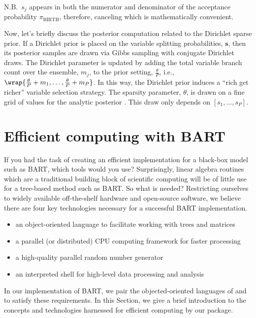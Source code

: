 \documentclass[article]{jss}
\begin{document}
N.B.\ $s_j$ appears in both the numerator and denominator
of the acceptance probability $\pi_{\mathrm{BIRTH}}$,
therefore, canceling which is mathematically convenient.

Now, let's briefly discuss the posterior computation related to the
Dirichlet sparse prior.  If a Dirichlet prior is placed on the
variable splitting probabilities, $\bm{s}$, then its posterior samples
are drawn via Gibbs sampling with conjugate Dirichlet draws.  The
Dirichlet parameter is updated by adding the total variable
branch count over the ensemble, $m_j$, to the prior setting,
$\frac{\theta}{P}$, i.e.,
$\wrap{\frac{\theta}{P}+m_1, \dots, \frac{\theta}{P}+m_P}$.
In this way, the Dirichlet prior
induces a ``rich get richer'' variable selection strategy.
The sparsity parameter, $\theta$, is drawn on a fine grid of values
for the analytic posterior \citep{Line16}. This draw only depends on
$[s_1,\dots,s_P]$.

\section{Efficient computing with BART}\label{efficient}

If you had the task of creating an efficient implementation for a
black-box model such as BART, which tools would you use?
Surprisingly, linear algebra routines which are a traditional building
block of scientific computing will be of little use for a tree-based
method such as BART.  So what is needed?  Restricting ourselves to
widely available off-the-shelf hardware and open-source software,
we believe there are four key technologies necessary for a successful
BART implementation.
\begin{itemize}
\item an object-oriented language to facilitate working with trees and matrices
\item a parallel (or distributed) CPU computing framework for faster processing
\item a high-quality parallel random number generator
\item an interpreted shell for high-level data processing and analysis
\end{itemize}
In our implementation of BART, we pair the objected-oriented languages
of  and  to satisfy these requirements.  In
this Section, we give a brief introduction to the concepts and
technologies harnessed for efficient computing by our 
package.
\end{document}
